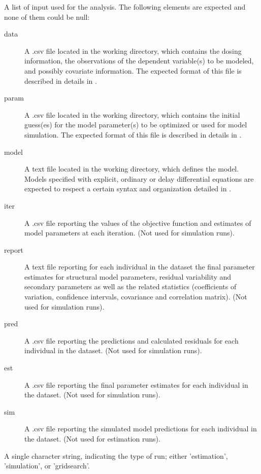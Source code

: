 \begin{Arguments}
\begin{ldescription}
\item[\code{files}] A list of input used for the analysis. The following elements are
expected and none of them could be null: \begin{description}

\item[data] A .csv file located in the working directory, which contains
the dosing information, the observations of the dependent variable(s)
to be modeled, and possibly covariate information. The expected format 
of this file is described in details in .
\item[param] A .csv file located in the working directory, which contains
the initial guess(es) for the model parameter(s) to be optimized or used
for model simulation. The expected format of this file is described in
details in .
\item[model] A text file located in the working directory, which defines 
the model. Models specified with explicit, ordinary or delay
differential equations are expected to respect a certain syntax and 
organization detailed in .
\item[iter] A .csv file reporting the values of the objective function
and estimates of model parameters at each iteration.  (Not used for 
simulation runs).
\item[report] A text file reporting for each individual in the dataset the
final parameter estimates for structural model parameters, residual 
variability and secondary parameters as well as the related statistics 
(coefficients of variation, confidence intervals, covariance and 
correlation matrix). (Not used for simulation runs).
\item[pred] A .csv file reporting the predictions and calculated residuals
for each individual in the dataset. (Not used for simulation runs).
\item[est] A .csv file reporting the final parameter estimates for each
individual in the dataset. (Not used for simulation runs).
\item[sim] A .csv file reporting the simulated model predictions for each 
individual in the dataset. (Not used for estimation runs).

\end{description}


\item[\code{runtype}] A single character string, indicating the type of run; either
'estimation', 'simulation', or 'gridsearch'.
\end{ldescription}
\end{Arguments}
